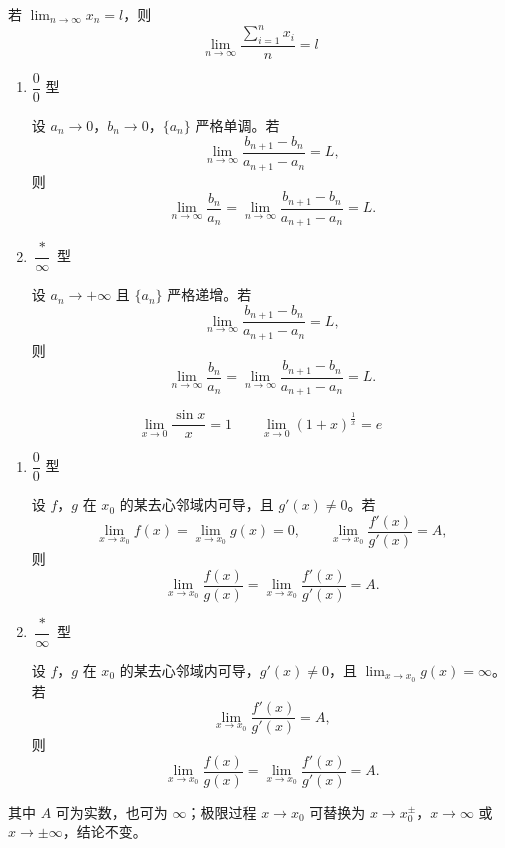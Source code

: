 \documentclass[lang=cn,chinesefont=founder,10pt]{elegantbook}
\begin{document}
\begin{theorem}[Cauchy命题]
    若 $\displaystyle\lim_{n \to \infty} x_n = l$，则
    \[
        \lim_{n \to \infty} \frac{\sum_{i=1}^{n} x_i}{n} = l
    \]
\end{theorem}

\newpage

\begin{theorem}[stolz定理]
    \begin{enumerate}
        \item $\dfrac{0}{0}$ 型

        设 $a_n \to 0$，$b_n \to 0$，$\{a_n\}$ 严格单调。若
        \[
            \lim_{n \to \infty} \frac{b_{n+1} - b_n}{a_{n+1} - a_n} = L,
        \]
        则
        \[
            \lim_{n \to \infty} \frac{b_n}{a_n} = \lim_{n \to \infty} \frac{b_{n+1} - b_n}{a_{n+1} - a_n} = L.
        \]
        \item $\dfrac{*}{\infty}$ 型

        设 $a_n \to +\infty$ 且 $\{a_n\}$ 严格递增。若
        \[
            \lim_{n \to \infty} \frac{b_{n+1} - b_n}{a_{n+1} - a_n} = L,
        \]
        则
        \[
            \lim_{n \to \infty} \frac{b_n}{a_n} = \lim_{n \to \infty} \frac{b_{n+1} - b_n}{a_{n+1} - a_n} = L.
        \]
    \end{enumerate}
\end{theorem}

\begin{theorem}[重要极限]
    \[
        \lim_{x \to 0} \frac{\sin x}{x} = 1 \qquad
        \lim_{x \to 0} (1+x)^{\frac{1}{x}} = e
    \]
\end{theorem}

\begin{theorem}[L'Hopital法则]
    \begin{enumerate}
        \item $\dfrac{0}{0}$ 型

        设 $f$，$g$ 在 $x_0$ 的某去心邻域内可导，且 $g'(x) \neq 0$。若
        \[
            \lim_{x \to x_0} f(x) = \lim_{x \to x_0} g(x) = 0, \qquad
            \lim_{x \to x_0} \frac{f'(x)}{g'(x)} = A,
        \]
        则
        \[
            \lim_{x \to x_0} \frac{f(x)}{g(x)} = \lim_{x \to x_0} \frac{f'(x)}{g'(x)} = A.
        \]
        \item $\dfrac{*}{\infty}$ 型

        设 $f$，$g$ 在 $x_0$ 的某去心邻域内可导，$g'(x) \neq 0$，且 $\displaystyle\lim_{x \to x_0} g(x) = \infty$。若
        \[
            \lim_{x \to x_0} \frac{f'(x)}{g'(x)} = A,
        \]
        则
        \[
            \lim_{x \to x_0} \frac{f(x)}{g(x)} = \lim_{x \to x_0} \frac{f'(x)}{g'(x)} = A.
        \]
    \end{enumerate}
    其中 $A$ 可为实数，也可为 $\infty$；极限过程 $x \to x_0$ 可替换为 $x \to x_0^{\pm}$，$x \to \infty$ 或 $x \to \pm\infty$，结论不变。
\end{theorem}
\end{document}

